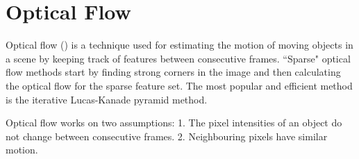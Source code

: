 \section{Optical Flow} 
\label{Optical Flow}
Optical flow () is a technique used for estimating the motion of moving objects in a scene by keeping track of features between consecutive frames. \textquotedblleft Sparse" optical flow methods start by finding strong corners in the image and then calculating the optical flow for the sparse feature set. The most popular and efficient method is the iterative Lucas-Kanade pyramid method.

Optical flow works on two assumptions:\newline
\tab \hspace{8mm}1. The pixel intensities of an object do not change between consecutive frames.\newline
\tab \hspace{8mm}2. Neighbouring pixels have similar motion.

